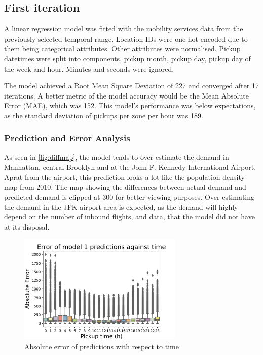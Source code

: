 \documentclass[11pt]{article}
\begin{document}
\subsection{First iteration}
A linear regression model was fitted with the mobility services data from the previously selected temporal range. Location IDs were one-hot-encoded due to them being categorical attributes. Other attributes were normalised. Pickup datetimes were split into components, pickup month, pickup day, pickup day of the week and hour. Minutes and seconds were ignored.


The model achieved a Root Mean Square Deviation of 227 and converged after 17 iterations. A better metric of the model accuracy would be the Mean Absolute Error (MAE), which was 152. This model's performance was below expectations, as the standard deviation of pickups per zone per hour was 189. 


\subsubsection{Prediction and Error Analysis}


As seen in \autoref{fig:diffmap}, the model tends to over estimate the demand in Manhattan, central Brooklyn and at the John F. Kennedy International Airport. Aprat from the airport, this prediction looks a lot like the population density map \cite{key} from 2010. The map showing the differences between actual demand and predicted demand is clipped at 300 for better viewing purposes. Over estimating the demand in the JFK airport area is expected, as the demand will highly depend on the number of inbound flights, and data, that the model did not have at its disposal.

\begin{figure}
    \includegraphics[width=0.70\textwidth]{model1_error_hour.jpeg}
    \centering
    \caption{Absolute error of predictions with respect to time} \label{fig:maemodel1}
\end{figure}
\end{document}
